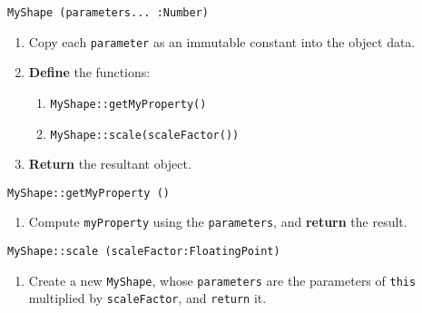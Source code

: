 \algorithm
\texttt{MyShape (parameters... :Number)}
\begin{enumerate}
	\item Copy each \texttt{parameter} as an immutable constant into the object data.
	\item \textbf{Define} the functions:
	\begin{enumerate}
		\item \texttt{MyShape::getMyProperty()}
		\item \texttt{MyShape::scale(scaleFactor())}
	\end{enumerate}
	\item \textbf{Return} the resultant object.
\end{enumerate}
\vspace{5mm}
\texttt{MyShape::getMyProperty ()}
\begin{enumerate}
	\item Compute \texttt{myProperty} using the \texttt{parameters}, and \textbf{return} the result.
\end{enumerate}
\vspace{5mm}
\texttt{MyShape::scale (scaleFactor:FloatingPoint)}
\begin{enumerate}
	\item Create a new \texttt{MyShape}, whose \texttt{parameters} are the parameters of \texttt{this} multiplied by
		\texttt{scaleFactor}, and \texttt{return} it.
\end{enumerate}

\sourcecode














